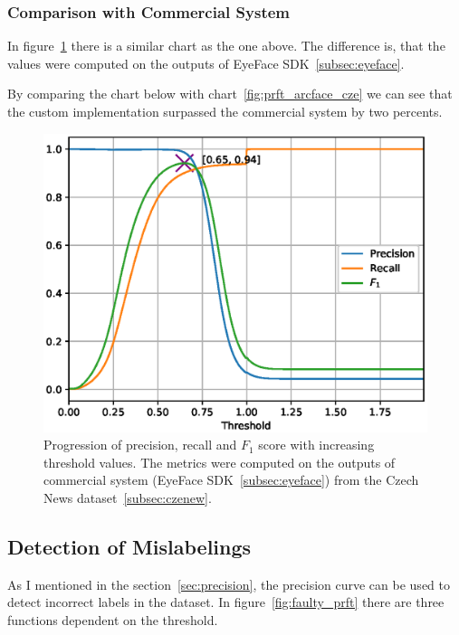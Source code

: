\subsubsection{Comparison with Commercial System}\label{subsubsec:performance-comparison}
In figure~\ref{fig:prft_eyedea} there is a similar chart as the one above.
The difference is, that the values were computed on the outputs of EyeFace SDK~\ref{subsec:eyeface}.

By comparing the chart below with chart~\ref{fig:prft_arcface_cze} we can see that the custom implementation
surpassed the commercial system by two percents.

\begin{figure}[H]
    \centering
    \includegraphics[width=0.95\columnwidth]{images/implementation/prft_eyedea.eps}
    \caption{Progression of precision, recall and $F_1$ score with increasing threshold values. The metrics were
    computed on the outputs of commercial system (EyeFace SDK~\ref{subsec:eyeface}) from the Czech News
    dataset~\ref{subsec:czenew}.}
    \label{fig:prft_eyedea}
\end{figure}

\subsection{Detection of Mislabelings}\label{subsec:detection-mislabelings}
As I mentioned in the section~\ref{sec:precision}, the precision curve can be used to detect incorrect labels in the
dataset.
In figure~\ref{fig:faulty_prft} there are three functions dependent on the threshold.

